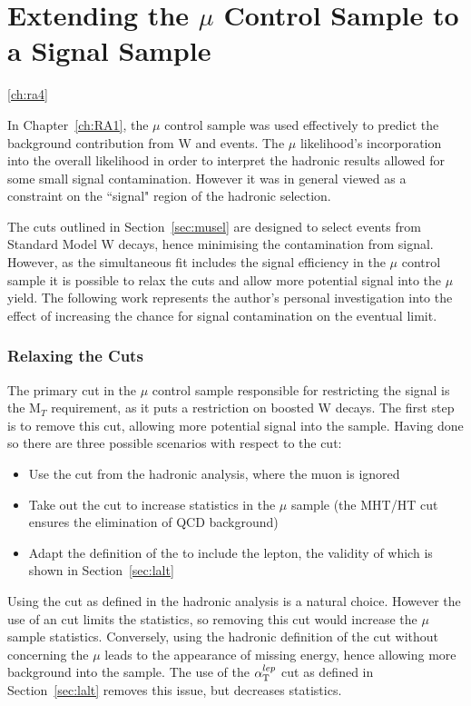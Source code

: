 \chapter{Extending the $\mu$ Control Sample to a Signal Sample}
\ref{ch:ra4}

In Chapter~\ref{ch:RA1}, the $\mu$ control sample was used effectively to predict the background contribution from W and \tto events. The $\mu$ likelihood's incorporation into the overall likelihood in order to interpret the hadronic results allowed for some small signal contamination. However it was in general viewed as a constraint on the ``signal" region of the hadronic selection. 

The cuts outlined in Section~\ref{sec:musel} are designed to select events from Standard Model W decays, hence minimising the contamination from signal. However, as the simultaneous fit includes the signal efficiency in the $\mu$ control sample it is possible to relax the cuts and allow more potential signal into the $\mu$ yield. The following work represents the author's personal investigation into the effect of increasing the chance for signal contamination on the eventual limit. 

\subsection{Relaxing the Cuts}

The primary cut in the $\mu$ control sample responsible for restricting the signal is the M$_{T}$ requirement, as it puts a restriction on boosted W decays. The first step is to remove this cut, allowing more potential signal into the sample. Having done so there are three possible scenarios with respect to the \alt cut:

\begin{itemize}
\item Use the \alt cut from the hadronic analysis, where the muon is ignored
\item Take out the \alt cut to increase statistics in the $\mu$ sample (the MHT/HT cut ensures the elimination of QCD background)
\item Adapt the definition of the \alt to include the lepton, the validity of which is shown in Section~\ref{sec:lalt}
\end{itemize}

Using the \alt cut as defined in the hadronic analysis is a natural choice. However the use of an \alt cut limits the statistics, so removing this cut would increase the $\mu$ sample statistics. Conversely, using the hadronic definition of the \alt cut without concerning the $\mu$ leads to the appearance of missing energy, hence allowing more background into the sample. The use of the $\alpha_{\text{T}}^{lep}$ cut as defined in Section~\ref{sec:lalt} removes this issue, but decreases statistics. 

